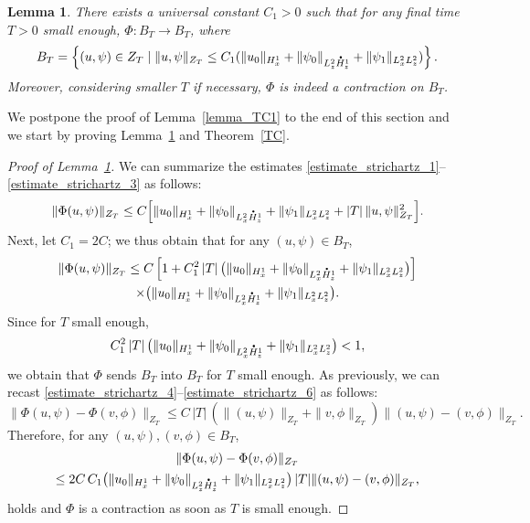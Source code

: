 \documentclass[10pt]{amsart}
\let\sep\mid
\newtheorem{lemma}{Lemma}[section]
\theoremstyle{definition}
\newcommand*{\overbigdot}[1]{%
\accentset{\mbox{\large\bfseries .}}{#1}}
\newenvironment{ProofOf}[1]{\begin{proof}[Proof of #1]}{\end{proof}}
\begin{document}
\begin{lemma}\label{lemma_TC2}
There exists a universal constant $C_{1}>0$ such that for any final time $T>0$ small enough, $\Phi:B_{T}\to B_{T}$, where
\[
B_{T}=\left\{(u,\psi)\in Z_{T}\sep \|u,\psi\|_{Z_{T}}\leq C_{1}(\|u_{0}\|_{H_{x}^{1}}+\|\psi_{0}\|_{L_{z}^{2}\overbigdot{H}_{z}^{1}}+\|\psi_{1}\|_{L_{x}^{2}L_{z}^{2}})\right\}.
\]
Moreover, considering smaller $T$ if necessary, $\Phi$ is indeed a contraction on $B_{T}$.
\end{lemma}

We postpone the proof of Lemma~\ref{lemma_TC1} to the end of this section and we start by proving Lemma~\ref{lemma_TC2} and Theorem~\ref{TC}.

\begin{ProofOf}{Lemma~\ref{lemma_TC2}}
We can summarize the estimates \eqref{estimate_strichartz_1}--\eqref{estimate_strichartz_3} as follows:
\[
\|\Phi(u,\psi)\|_{Z_{T}}\leq C\Bigl[\|u_{0}\|_{H_{x}^{1}}+\|\psi_{0}\|_{L_{x}^{2}\overbigdot{H}_{z}^{1}}+\|\psi_{1}\|_{L_{x}^{2}L_{z}^{2}}+|T|\,\|u,\psi\|_{Z_{T}}^{2}\Bigr].
\]
Next, let $C_{1}=2C$; we thus obtain that for any $(u,\psi)\in B_{T}$,
\begin{multline*}
\|\Phi(u,\psi)\|_{Z_{T}}\leq C\left[1+C_{1}^{2}\,|T|\, \bigl(\|u_{0}\|_{H_{x}^{1}}+\|\psi_{0}\|_{L_{x}^{2}\overbigdot{H}_{z}^{1}}+\|\psi_{1}\|_{L_{x}^{2}L_{z}^{2}} \bigr)\right]\\
\times\bigl(\|u_{0}\|_{H_{x}^{1}}+\|\psi_{0}\|_{L_{x}^{2}\overbigdot{H}_{z}^{1}}+\|\psi_{1}\|_{L_{x}^{2}L_{z}^{2}}\bigr).
\end{multline*}
Since for $T$ small enough,
\[
C_{1}^{2}\,|T|\, \bigl(\|u_{0}\|_{H_{x}^{1}}+\|\psi_{0}\|_{L_{x}^{2}\overbigdot{H}_{z}^{1}}+\|\psi_{1}\|_{L_{x}^{2}L_{z}^{2}} \bigr)<1,
\]
we obtain that $\Phi$ sends $B_{T}$ into $B_{T}$ for $T$ small enough. As previously, we can recast \eqref{estimate_strichartz_4}--\eqref{estimate_strichartz_6} as follows:\vspace*{-3pt}
\[
\|\Phi(u,\psi)-\Phi(v,\phi)\|_{Z_{T}}\leq C\,|T|\,\left(\|(u,\psi)\|_{Z_{T}}+\|v,\phi\|_{Z_{T}}\right)\|(u,\psi)-(v,\phi)\|_{Z_{T}}.
\]
Therefore, for any $(u,\psi),(v,\phi)\in B_{T}$,\vspace*{-5pt}
\begin{multline*}
\|\Phi(u,\psi)-\Phi(v,\phi)\|_{Z_{T}}
\\
\leq 2C\,C_{1} \bigl(\|u_{0}\|_{H_{x}^{1}}+\|\psi_{0}\|_{L_{z}^{2}\overbigdot{H}_{z}^{1}}+\|\psi_{1}\|_{L_{x}^{2}L_{z}^{2}} \bigr)\,|T|\|(u,\psi)-(v,\phi)\|_{Z_{T}},
\end{multline*}
holds and $\Phi$ is a contraction as soon as $T$ is small enough.
\end{ProofOf}
\end{document}
